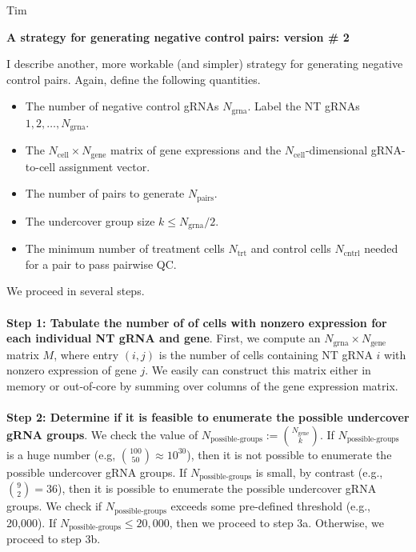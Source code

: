 \documentclass[12pt]{article}
\begin{document}
\noindent
Tim

\begin{center}
\textbf{A strategy for generating negative control pairs: version \# 2}
\end{center}

I describe another, more workable (and simpler) strategy for generating negative control pairs. Again, define the following quantities.

\begin{itemize}
	\item The number of negative control gRNAs $N_\textrm{grna}$. Label the NT gRNAs $1, 2, \dots, N_\textrm{grna}$.
	\item The $N_\textrm{cell} \times N_\textrm{gene}$ matrix of gene expressions and the $N_\textrm{cell}$-dimensional gRNA-to-cell assignment vector.
	\item The number of pairs to generate $N_\textrm{pairs}$.
	\item The undercover group size $k \leq N_\textrm{grna}/2$.
	\item The minimum number of treatment cells $N_\textrm{trt}$ and control cells $N_\textrm{cntrl}$ needed for a pair to pass pairwise QC.
\end{itemize}
We proceed in several steps.
\\ \\
\textbf{Step 1: Tabulate the number of of cells with nonzero expression for each individual NT gRNA and gene}. First, we compute an $N_\textrm{grna} \times N_\textrm{gene}$ matrix $M$, where entry $(i,j)$ is the number of cells containing NT gRNA $i$ with nonzero expression of gene $j$. We easily can construct this matrix either in memory or out-of-core by summing over columns of the gene expression matrix.
\\ \\
\textbf{Step 2: Determine if it is feasible to enumerate the possible undercover gRNA groups}. We check the value of $N_\textrm{possible-groups} := \binom{N_\textrm{gene}}{k}$. If $N_\textrm{possible-groups}$ is a huge number (e.g, $ \binom{100}{50} \approx 10^{30}$), then it is not possible to enumerate the possible undercover gRNA groups. If $N_\textrm{possible-groups}$ is small, by contrast (e.g., $\binom{9}{2} = 36$), then it is possible to enumerate the possible undercover gRNA groups. We check if $N_\textrm{possible-groups}$ exceeds some pre-defined threshold (e.g., 20,000). If $N_\textrm{possible-groups} \leq 20,000$, then we proceed to step 3a. Otherwise, we proceed to step 3b. 
\\ \\
\end{document}
